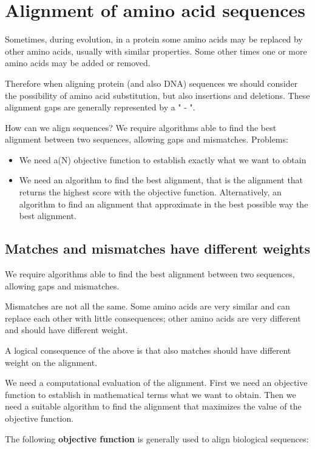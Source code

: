 \section{Alignment of amino acid sequences}

Sometimes, during evolution, in a protein some amino acids may be replaced 
by other amino acids, usually with similar properties. Some other times one or 
more amino acids may be added or removed. 

Therefore when aligning protein (and also DNA) sequences we should consider 
the possibility of amino acid substitution, but also insertions and deletions.
These alignment gaps are generally represented by a " - ".

How can we align sequences?
We require algorithms able to find the best alignment between two sequences,
allowing gaps and mismatches.
Problems:
\begin{itemize}
  \item We need a(N) objective function to establish exactly what we want to obtain
  \item We need an algorithm to find the best alignment, that is the alignment
that returns the highest score with the objective function. Alternatively, an
algorithm to find an alignment that approximate in the best possible way the
best alignment.
\end{itemize}

\subsection{Matches and mismatches have different weights}

We require algorithms able to find the best alignment between two sequences,
allowing gaps and mismatches.

Mismatches are not all the same. Some amino acids are very similar and can 
replace each other with little consequences; other amino acids are very different 
and should have different weight.

A logical consequence of the above is that also matches should have different 
weight on the alignment.

We need a computational evaluation of the alignment. First we need an objective 
function to establish in mathematical terms what we want to obtain. 
Then we need a suitable algorithm to find the alignment that maximizes the 
value of the objective function.

The following \textbf{objective function} is generally used to align biological 
sequences: 

